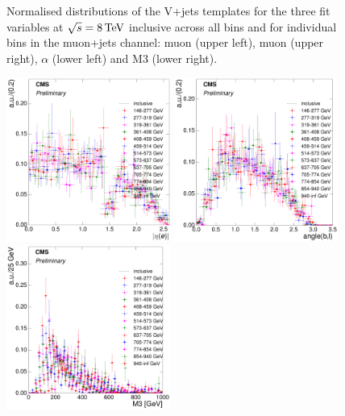 \begin{figure}[hbtp]
	 \caption{Normalised distributions of the V+jets templates for the three fit variables at $\sqrt{s}=8\,\text{Te\hspace{-.08em}V}$
	 inclusive across all \HT bins and for individual \HT bins in the muon+jets channel: muon \abseta (upper
	 left), muon \abseta (upper right), $\alpha$ (lower left) and M3 (lower right).}
     \label{fig:HT_fit_variable_vjets_comparisons_muon_8TeV}
\end{figure}

\begin{figure}[hbtp]
    \centering
     \includegraphics[width=0.48\textwidth]{Chapters/04_Analysis/04b_XSections/images/8TeV/fit_variables/electron/ST/electron_absolute_eta/vjets/ST_electron_absolute_eta_2orMoreBtags_VJets_template_comparison.pdf}\hfill
     \includegraphics[width=0.48\textwidth]{Chapters/04_Analysis/04b_XSections/images/8TeV/fit_variables/electron/ST/angle_bl/vjets/ST_angle_bl_2orMoreBtags_VJets_template_comparison.pdf}\hfill
     \includegraphics[width=0.48\textwidth]{Chapters/04_Analysis/04b_XSections/images/8TeV/fit_variables/electron/ST/M3/vjets/ST_M3_2orMoreBtags_VJets_template_comparison.pdf}\\

\end{figure}
